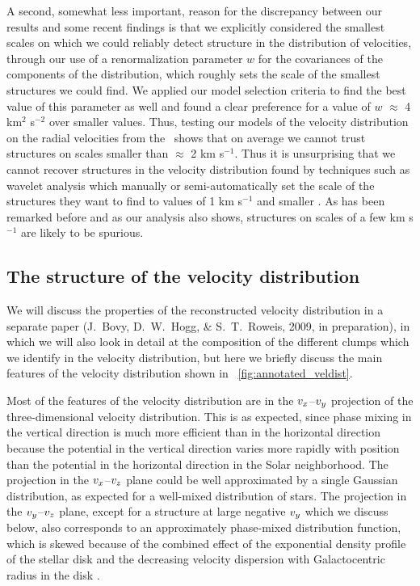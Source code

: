 A second, somewhat less important, reason for the discrepancy between
our results and some recent findings is that we explicitly considered
the smallest scales on which we could reliably detect structure in the
distribution of velocities, through our use of a renormalization
parameter $w$ for the covariances of the components of the
distribution, which roughly sets the scale of the smallest structures
we could find. We applied our model selection criteria to find the
best value of this parameter as well and found a clear preference for
a value of $w$ $\approx$ 4 km$^2$ s$^{-2}$ over smaller values. Thus,
testing our models of the velocity distribution on the radial
velocities from the \gcsabb\ shows that on average we cannot trust
structures on scales smaller than $\approx$ 2 km s$^{-1}$. Thus it is
unsurprising that we cannot recover structures in the velocity
distribution found by techniques such as wavelet analysis which
manually or semi-automatically set the scale of the structures they
want to find to values of 1 km s$^{-1}$ and smaller
\citep{2008A&A...490..135A,2009ApJ...692L.113Z}. As has been remarked
before \citep{1998AJ....115.2384D} and as our analysis also shows,
structures on scales of a few km s$^{-1}$ are likely to be spurious.


\subsection{The structure of the velocity distribution}

We will discuss the properties of the reconstructed velocity
distribution in a separate paper (J.~Bovy, D.~W.~Hogg, \&
S.~T.~Roweis, 2009, in preparation), in which we will also look in
detail at the composition of the different clumps which we identify in
the velocity distribution, but here we briefly discuss the main
features of the velocity distribution shown in
\figurename~\ref{fig:annotated_veldist}.

Most of the features of the velocity distribution are in the
$v_x$--$v_y$ projection of the three-dimensional velocity
distribution. This is as expected, since phase mixing in the vertical
direction is much more efficient than in the horizontal direction
because the potential in the vertical direction varies more rapidly
with position than the potential in the horizontal direction in the
Solar neighborhood. The projection in the $v_x$--$v_z$ plane could be
well approximated by a single Gaussian distribution, as expected for a
well-mixed distribution of stars. The projection in the $v_y$--$v_z$
plane, except for a structure at large negative $v_y$ which we discuss
below, also corresponds to an approximately phase-mixed distribution
function, which is skewed because of the combined effect of the
exponential density profile of the stellar disk and the decreasing
velocity dispersion with Galactocentric radius in the disk
\citep{2008gady.book.....B}.

